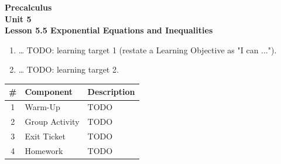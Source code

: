 \documentclass[10pt]{article}
\begin{document}
\vspace{-0.8in}

\begin{center}
  {\color{white}\textbf{\LARGE Precalculus}}\\[4pt]
  {\color{skymid}\large\textbf{Unit 5}}\\[6pt]
  {\color{white}\textbf{\large Lesson 5.5 \quad Exponential Equations and Inequalities}}
\end{center}

\vspace{0.22in}
\namedateperiod
\vspace{0.18in}

\begin{learningtargetbox}
\small
\begin{enumerate}[leftmargin=1.5em, itemsep=5pt]
  \item \ldots{} TODO: learning target 1 (restate a Learning Objective as "I can ...").
  \item \ldots{} TODO: learning target 2.
\end{enumerate}
\end{learningtargetbox}

\vspace{0.14in}

\begin{tocbox}
\small
\renewcommand{\arraystretch}{1.5}
\begin{tabularx}{\linewidth}{@{} c l X @{}}
\rowcolor{sky}
\textbf{\#} & \textbf{Component} & \textbf{Description} \\
\midrule
1 & Warm-Up      & TODO \\
2 & Group Activity & TODO \\
3 & Exit Ticket  & TODO \\
4 & Homework     & TODO \\
\end{tabularx}
\end{tocbox}
\end{document}
